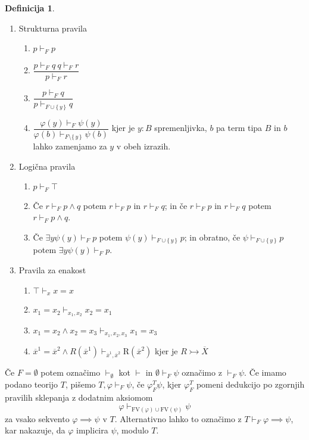 \documentclass[12pt,a4paper]{book}
\theoremstyle{definition}
\newtheorem{definicija}{Definicija}[chapter]
\theoremstyle{plain}
\theoremstyle{definition}
\theoremstyle{remark}
\renewcommand{\set}[1]{\{\,#1\,\}}
\begin{document}
\begin{definicija}
  $ $
  \begin{enumerate}[label*=\arabic*.]
    \item Strukturna pravila
    \begin{enumerate}[label*=\arabic*.]
      \item $p \vdash_F p$
      \item $\dfrac{p \vdash_F q \ q \vdash_F r}{p \vdash_F r}$
      \item $\dfrac{p \vdash_F q}{p \vdash_{F \cup \set{y}} q}$
      \item $\dfrac{\varphi(y) \vdash_F \psi(y)}{\varphi(b) \vdash_{F\setminus\set{y}} \psi(b)}$
      kjer je $y : B$ spremenljivka, $b$ pa term tipa $B$ in $b$ lahko zamenjamo za $y$ v obeh izrazih.
    \end{enumerate}
    \item Logična pravila
    \begin{enumerate}[label*=\arabic*.]
      \item $p \vdash_F \top$
      \item Če $r \vdash_F p \wedge q$ potem $r \vdash_F p$ in $r \vdash_F q$; in če $r \vdash_F p$ in $r \vdash_F q$ potem $r \vdash_F p \wedge q$.
      \item Če $\exists y \psi(y) \vdash_F p$ potem $\psi(y) \vdash_{F \cup \set{y}} p$; in obratno, če $\psi \vdash_{F \cup \set{y}} p$ potem $\exists y \psi(y) \vdash_F p$.
    \end{enumerate}
    \item Pravila za enakost
    \begin{enumerate}[label*=\arabic*.]
      \item $\top \vdash_x x = x$
      \item $x_1 = x_2 \vdash_{x_1, x_2} x_2 = x_1$
      \item $x_1 = x_2 \wedge x_2 = x_3 \vdash_{x_1, x_2, x_3} x_1 = x_3$
      \item $\overline{x}^1 = \overline{x}^2 \wedge R(\overline{x}^1) \vdash_{\overline{x}^1, \overline{x}^2} \mathrm{R}(\overline{x}^2)$
      kjer je $R \rightarrowtail \overline{X}$
    \end{enumerate}
  \end{enumerate}
  Če $F = \emptyset$ potem označimo $\vdash_\emptyset$ kot $\vdash$ in $\emptyset \vdash_F \psi$ označimo z $\vdash_F \psi$.
  Če imamo podano teorijo $T$, pišemo $T, \varphi \vdash_F \psi$, če $\varphi_F^T \psi$, kjer $\varphi_F^T$ pomeni dedukcijo po zgornjih pravilih sklepanja z dodatnim aksiomom
  $$\varphi \vdash_{\mathrm{FV}(\varphi) \cup \mathrm{FV}(\psi)} \psi$$
  za vsako sekvento $\varphi \implies \psi$ v $T$. Alternativno lahko to označimo z $T \vdash_F \varphi \implies \psi$, kar nakazuje, da $\varphi$ implicira $\psi$, modulo $T$.
\end{definicija}
%
\end{document}

